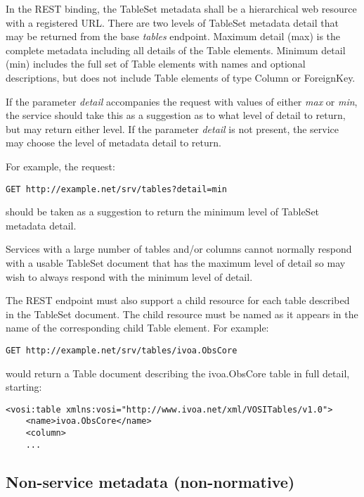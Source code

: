 \documentclass[11pt,letter]{ivoa}
\begin{document}
In the REST binding, the TableSet metadata shall be a hierarchical web
resource with a registered URL.  There are two levels of TableSet
metadata detail that may be returned from the base \textit{tables}
endpoint.  Maximum detail (max) is the complete metadata including all
details of the Table elements.  Minimum detail (min) includes the full
set of Table elements with names and optional descriptions, but does not
include Table elements of type Column or ForeignKey.

If the parameter \textit{detail} accompanies the request with values of
either \textit{max} or \textit{min}, the service should take this as a
suggestion as to what level of detail to return, but may return either
level.  If the parameter \textit{detail} is not present, the service may
choose the level of metadata detail to return.

For example, the request:

\begin{verbatim}
GET http://example.net/srv/tables?detail=min
\end{verbatim}

should be taken as a suggestion to return the minimum level of TableSet
metadata detail.

Services with a large number of tables and/or columns cannot normally
respond with a usable TableSet document that has the maximum level of
detail so may wish to always respond with the minimum level of detail.

The REST endpoint must also support a child resource for each table
described in the TableSet document.  The child resource must be named as
it appears in the name of the corresponding child Table element.  For
example:

\begin{verbatim}
GET http://example.net/srv/tables/ivoa.ObsCore
\end{verbatim}

would return a Table document describing the ivoa.ObsCore table in full
detail, starting:

\begin{verbatim}
<vosi:table xmlns:vosi="http://www.ivoa.net/xml/VOSITables/v1.0">
    <name>ivoa.ObsCore</name>
    <column>
    ...
\end{verbatim} 

\subsection{Non-service metadata (non-normative)}
\end{document}
